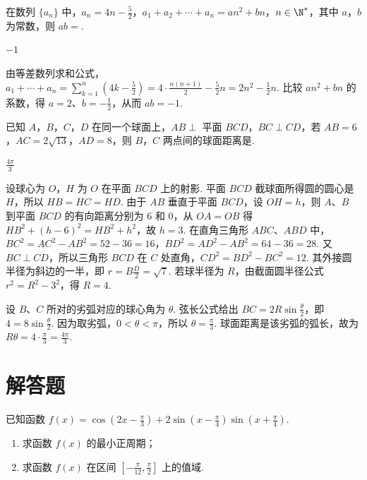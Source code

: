 \begin{problem}
在数列 \(\{a_{n}\}\) 中，\(a_{n}=4n-\frac{5}{2}\)，\(a_{1}+a_{2}+\cdots+a_{n}=an^{2}+bn\)，\(n\in\N^{*}\)，其中 \(a\)，\(b\) 为常数，则 \(ab=\)\fillinblank{}.
\end{problem}

\begin{answer}
\(-1\)
\end{answer}

\begin{solution}
由等差数列求和公式，\(a_1+\cdots+a_n=\sum_{k=1}^n\left(4k-\frac52\right)=4\cdot\frac{n(n+1)}2-\frac52n=2n^2-\frac12n\). 比较 \(an^2+bn\) 的系数，得 \(a=2\)、\(b=-\frac{1}{2}\)，从而 \(ab=-1\).
\end{solution}

\begin{problem}
已知 \(A\)，\(B\)，\(C\)，\(D\) 在同一个球面上，\(AB \perp\) 平面 \(BCD\)，\(BC \perp CD\)，若 \(AB = 6\)，\(AC = 2\sqrt{13}\)，\(AD = 8\)，则 \(B\)，\(C\) 两点间的球面距离是\fillinblank{}.
\end{problem}

\begin{answer}
\(\frac{4\pi}{3}\)
\end{answer}

\begin{solution}
设球心为 \(O\)，\(H\) 为 \(O\) 在平面 \(BCD\) 上的射影. 平面 \(BCD\) 截球面所得圆的圆心是 \(H\)，所以 \(HB=HC=HD\). 由于 \(AB\) 垂直于平面 \(BCD\)，设 \(OH=h\)，则 \(A\)、\(B\) 到平面 \(BCD\) 的有向距离分别为 \(6\) 和 \(0\)，从 \(OA=OB\) 得 \(HB^2+(h-6)^2=HB^2+h^2\)，故 \(h=3\). 在直角三角形 \(ABC\)、\(ABD\) 中，\(BC^2=AC^2-AB^2=52-36=16\)，\(BD^2=AD^2-AB^2=64-36=28\). 又 \(BC\perp CD\)，所以三角形 \(BCD\) 在 \(C\) 处直角，\(CD^2=BD^2-BC^2=12\). 其外接圆半径为斜边的一半，即 \(r=B\frac{D}{2}=\sqrt7\). 若球半径为 \(R\)，由截面圆半径公式 \(r^2=R^2-3^2\)，得 \(R=4\).

设 \(B\)、\(C\) 所对的劣弧对应的球心角为 \(\theta\). 弦长公式给出 \(BC=2R\sin\frac{\theta}{2}\)，即 \(4=8\sin\frac{\theta}{2}\). 因为取劣弧，\(0<\theta<\pi\)，所以 \(\theta=\frac{\pi}{3}\). 球面距离是该劣弧的弧长，故为 \(R\theta=4\cdot\frac\pi3=\frac{4\pi}{3}\).
\end{solution}

\section{解答题}

\begin{problem}
已知函数 \( f(x) = \cos \left(2x - \frac{\pi}{3}\right) + 2\sin \left(x - \frac{\pi}{4}\right)\sin \left(x + \frac{\pi}{4}\right) \).

\begin{enumerate}
\item 求函数 \( f(x) \) 的最小正周期；
\item 求函数 \( f(x) \) 在区间 \( \left[-\frac{\pi}{12}, \frac{\pi}{2}\right] \) 上的值域.
\end{enumerate}
\end{problem}

